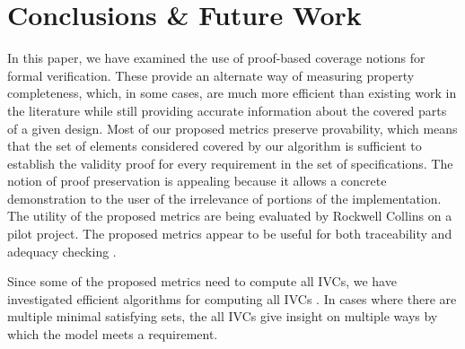 \section{Conclusions \& Future Work}
\label{sec:conclusion}

In this paper, we have examined the use of proof-based coverage notions for formal verification.  These provide an alternate way of measuring property completeness, which, 
in some cases, are much more efficient than existing work in the literature while still providing accurate information about the covered parts of a given design.
Most of our proposed metrics preserve provability, which means that the set of elements considered covered by our algorithm is sufficient to establish the validity proof for every requirement in the set of specifications.
The notion of proof preservation is appealing because it allows a concrete demonstration to the user of the irrelevance of portions of the implementation. The utility of the proposed metrics are being evaluated by Rockwell Collins on a pilot project. The proposed metrics
appear to be useful for both traceability and adequacy checking \cite{lucas17}.

Since some of the proposed metrics need to compute all IVCs,
we have investigated efficient algorithms for computing all IVCs \cite{Ghass17}. In cases where there are multiple minimal satisfying sets, the all IVCs give insight on multiple ways by which the model meets a requirement.


